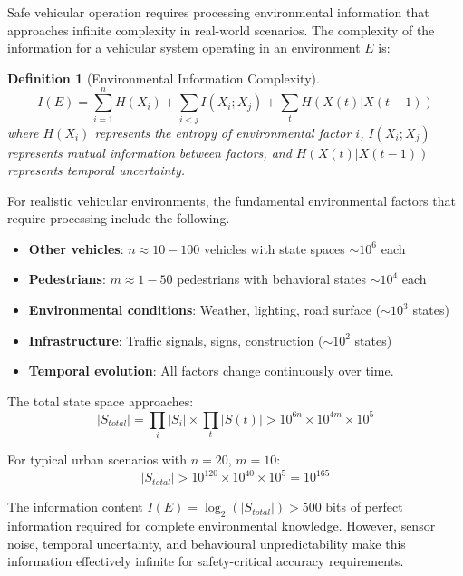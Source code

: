 \documentclass[12pt,a4paper]{article}
\newtheorem{definition}[theorem]{Definition}
\begin{document}
Safe vehicular operation requires processing environmental information that approaches infinite complexity in real-world scenarios. The complexity of the information for a vehicular system operating in an environment $E$ is:

\begin{definition}[Environmental Information Complexity]
\begin{equation}
I(E) = \sum_{i=1}^{n} H(X_i) + \sum_{i<j} I(X_i;X_j) + \sum_{t} H(X(t)|X(t-1))
\end{equation}
where $H(X_i)$ represents the entropy of environmental factor $i$, $I(X_i;X_j)$ represents mutual information between factors, and $H(X(t)|X(t-1))$ represents temporal uncertainty.
\end{definition}

For realistic vehicular environments, the fundamental environmental factors that require processing include the following.

\begin{itemize}
\item \textbf{Other vehicles}: $n \approx 10-100$ vehicles with state spaces $\sim 10^6$ each
\item \textbf{Pedestrians}: $m \approx 1-50$ pedestrians with behavioral states $\sim 10^4$ each  
\item \textbf{Environmental conditions}: Weather, lighting, road surface ($\sim 10^3$ states)
\item \textbf{Infrastructure}: Traffic signals, signs, construction ($\sim 10^2$ states)
\item \textbf{Temporal evolution}: All factors change continuously over time.
\end{itemize}

The total state space approaches:
\begin{equation}
|S_{total}| = \prod_{i} |S_i| \times \prod_{t} |S(t)| > 10^{6n} \times 10^{4m} \times 10^5
\end{equation}

For typical urban scenarios with $n=20$, $m=10$:
\begin{equation}
|S_{total}| > 10^{120} \times 10^{40} \times 10^5 = 10^{165}
\end{equation}

The information content $I(E) = \log_2(|S_{total}|) > 500$ bits of perfect information required for complete environmental knowledge. However, sensor noise, temporal uncertainty, and behavioural unpredictability make this information effectively infinite for safety-critical accuracy requirements.
\end{document}
